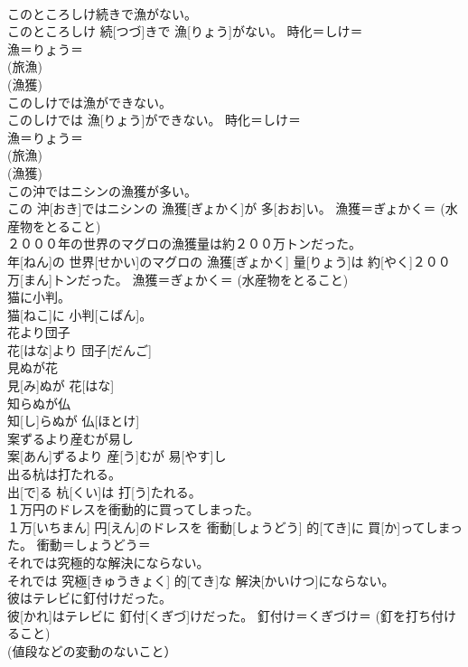 \documentclass[8pt]{extreport}
\begin{document}
\begin{CJK}{UTF8}{min}
{\\	このところしけ続きで漁がない。	
\\	このところしけ 続[つづ]きで 漁[りょう]がない。	時化＝しけ＝ 
\\	漁＝りょう＝ 
\\	(旅漁) 
\\	(漁獲) 
\\	このしけでは漁ができない。	
\\	このしけでは 漁[りょう]ができない。	時化＝しけ＝ 
\\	漁＝りょう＝ 
\\	(旅漁) 
\\	(漁獲) 
\\	この沖ではニシンの漁獲が多い。	
\\	この 沖[おき]ではニシンの 漁獲[ぎょかく]が 多[おお]い。	漁獲＝ぎょかく＝ (水産物をとること) 
\\	２０００年の世界のマグロの漁獲量は約２００万トンだった。	
\\	年[ねん]の 世界[せかい]のマグロの 漁獲[ぎょかく] 量[りょう]は 約[やく]２００ 万[まん]トンだった。	漁獲＝ぎょかく＝ (水産物をとること) 
\\	猫に小判。	
\\	猫[ねこ]に 小判[こばん]。	
\\	花より団子	
\\	花[はな]より 団子[だんご]	
\\	見ぬが花	
\\	見[み]ぬが 花[はな]	
\\	知らぬが仏	
\\	知[し]らぬが 仏[ほとけ]	
\\	案ずるより産むが易し	
\\	案[あん]ずるより 産[う]むが 易[やす]し	
\\	出る杭は打たれる。	
\\	出[で]る 杭[くい]は 打[う]たれる。	
\\	１万円のドレスを衝動的に買ってしまった。	
\\	１万[いちまん] 円[えん]のドレスを 衝動[しょうどう] 的[てき]に 買[か]ってしまった。	衝動＝しょうどう＝ 
\\	それでは究極的な解決にならない。	
\\	それでは 究極[きゅうきょく] 的[てき]な 解決[かいけつ]にならない。	
\\	彼はテレビに釘付けだった。	
\\	彼[かれ]はテレビに 釘付[くぎづ]けだった。	釘付け＝くぎづけ＝ (釘を打ち付けること) 
\\	(値段などの変動のないこと）
}
\end{CJK}
\end{document}
